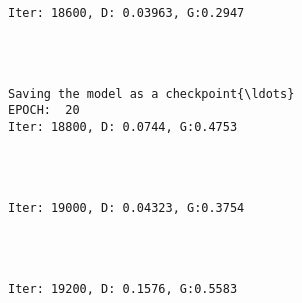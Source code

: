 \documentclass[11pt]{article}
\begin{document}
    \begin{Verbatim}[commandchars=\\\{\}]

Iter: 18600, D: 0.03963, G:0.2947
    \end{Verbatim}

    \begin{center}
    \end{center}
    { \hspace*{\fill} \\}
    
    \begin{Verbatim}[commandchars=\\\{\}]

Saving the model as a checkpoint{\ldots}
EPOCH:  20
Iter: 18800, D: 0.0744, G:0.4753
    \end{Verbatim}

    \begin{center}
    \end{center}
    { \hspace*{\fill} \\}
    
    \begin{Verbatim}[commandchars=\\\{\}]

Iter: 19000, D: 0.04323, G:0.3754
    \end{Verbatim}

    \begin{center}
    \end{center}
    { \hspace*{\fill} \\}
    
    \begin{Verbatim}[commandchars=\\\{\}]

Iter: 19200, D: 0.1576, G:0.5583
    \end{Verbatim}

    \begin{center}
    \end{center}
    { \hspace*{\fill} \\}
    
\end{document}
